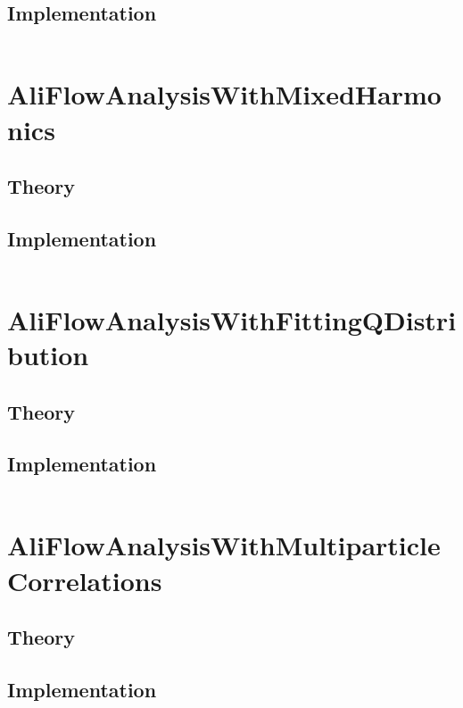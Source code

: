 \documentclass[a4paper]{book}
\numberwithin{equation}{subsection}
\begin{document}
\subsection{Implementation}
\begin{lstlisting}

\end{lstlisting}

\section{AliFlowAnalysisWithMixedHarmonics}
\subsection{Theory}
\subsection{Implementation}
\begin{lstlisting}

\end{lstlisting}

\section{AliFlowAnalysisWithFittingQDistribution}
\subsection{Theory}
\subsection{Implementation}
\begin{lstlisting}

\end{lstlisting}


\section{AliFlowAnalysisWithMultiparticleCorrelations}
\subsection{Theory}
\subsection{Implementation}
\begin{lstlisting}

\end{lstlisting}
\end{document}
